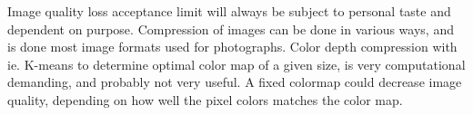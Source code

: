 \documentclass[a4paper,10pt,article,oneside,english]{memoir}
\begin{document}
Image quality loss acceptance limit will always be subject to personal taste and dependent on purpose. Compression of images can be done in various ways, and is done most image formats used for photographs. Color depth compression with ie. K-means to determine optimal color map of a given size, is very computational demanding, and probably not very useful. A fixed colormap could decrease image quality, depending on how well the pixel colors matches the color map.
\end{document}
